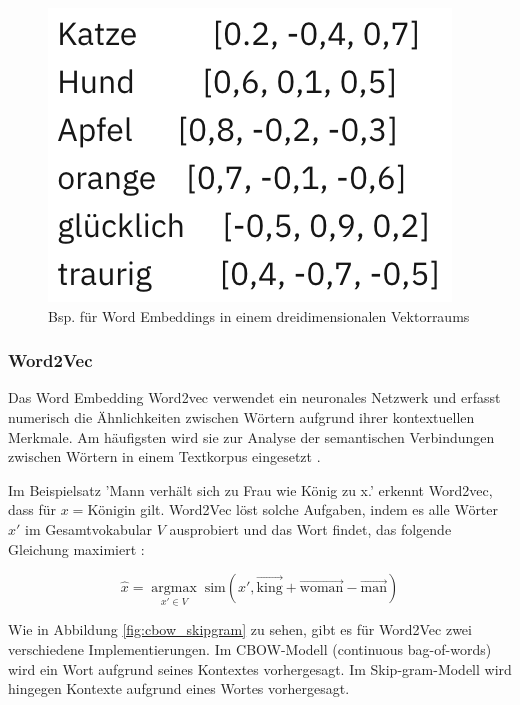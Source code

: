 \begin{figure}[htbp]
    \begin{center}
        \includegraphics[scale=0.6]{static/bsp_word_embeddings.png}
        \caption{\label{fig:bsp_word_embeddings} Bsp. für Word Embeddings in einem dreidimensionalen Vektorraums \cite{ibm2024wordembeddings}}
    \end{center}
\end{figure}

\subsubsection{Word2Vec}
\label{sec:word2vec}

Das Word Embedding Word2vec verwendet ein neuronales Netzwerk und erfasst numerisch die Ähnlichkeiten zwischen Wörtern aufgrund ihrer 
kontextuellen Merkmale. Am häufigsten wird sie zur Analyse der semantischen Verbindungen zwischen Wörtern in einem Textkorpus 
eingesetzt \cite{schumacher2024word2vec}.

Im Beispielsatz 'Mann verhält sich zu Frau wie König zu x.' erkennt Word2vec, dass für $x = \text{Königin}$ gilt. 
Word2Vec löst solche Aufgaben, indem es alle Wörter $x'$ im Gesamtvokabular $V$ ausprobiert 
und das Wort findet, das folgende Gleichung maximiert \cite{CHURCH_2017}:

\begin{equation}
    \hat{x} = \underset{x' \in V}{\operatorname{argmax}} \; \text{sim}(x', \vec{\text{king}} + \vec{\text{woman}} - \vec{\text{man}})
\end{equation}

Wie in Abbildung \ref{fig:cbow_skipgram} zu sehen, gibt es für Word2Vec zwei verschiedene Implementierungen.
Im CBOW-Modell (continuous bag-of-words) wird ein Wort aufgrund seines Kontextes vorhergesagt.
Im Skip-gram-Modell wird hingegen Kontexte aufgrund eines Wortes vorhergesagt.

